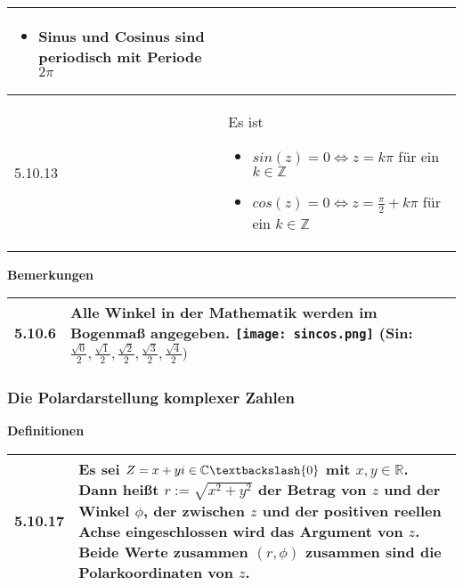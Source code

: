 \begin{table}[H]
\begin{tabularx}{\textwidth}{X m{16cm}}
\begin{itemize}[topsep=-0.5cm]
\begin{itemize}[topsep=-0.5cm]
                                    \item[] Sinus und Cosinus sind periodisch mit Periode $2\pi$      
                                \end{itemize} \vspace{-0cm}
                \end{itemize} \vspace{-0cm} \\
        \midrule
        5.10.13&Es ist
                \begin{itemize}[topsep=-0.5cm]
                    \item[] $sin(z) = 0 \Leftrightarrow z = k\pi$ für ein $k \in \mathbb{Z}$
                    \item[] $cos(z) = 0 \Leftrightarrow z = \frac{\pi}{2}+k\pi$ für ein $k \in \mathbb{Z}$ 
                \end{itemize} \vspace{-0cm} \\

        \bottomrule
    \end{tabularx}
    \end{table}

    \noindent
    \textbf{Bemerkungen}
    \begin{table}[H]
    \begin{tabularx}{\textwidth}{X m{16cm}}
        \toprule

        5.10.6& Alle Winkel in der Mathematik werden im Bogenmaß angegeben. \hfill \break
                \texttt{[image: sincos.png]} \hfill \break
                (Sin: $\frac{\sqrt{0}}{2},\frac{\sqrt{1}}{2},\frac{\sqrt{2}}{2},\frac{\sqrt{3}}{2},\frac{\sqrt{4}}{2})$\\

        \bottomrule
    \end{tabularx}
    \end{table}

\subsubsection{Die Polardarstellung komplexer Zahlen}

    \noindent
    \textbf{Definitionen}
    \begin{table}[H]  
    \begin{tabularx}{\textwidth}{X m{16cm}}
        \toprule

        5.10.17&Es sei $Z = x + yi \in \mathbb{C} \textbackslash \{0\}$ mit $x,y \in \mathbb{R}$. Dann heißt $r:= \sqrt{x^2+y^2}$ der \textbf{Betrag}
                von $z$ und der Winkel $\phi$, der zwischen $z$ und der positiven reellen Achse eingeschlossen wird das \textbf{Argument} von $z$.
                Beide Werte zusammen $(r,\phi)$ zusammen sind die \textbf{Polarkoordinaten} von $z$.\\

        \bottomrule

    \end{tabularx}
    \end{table}

